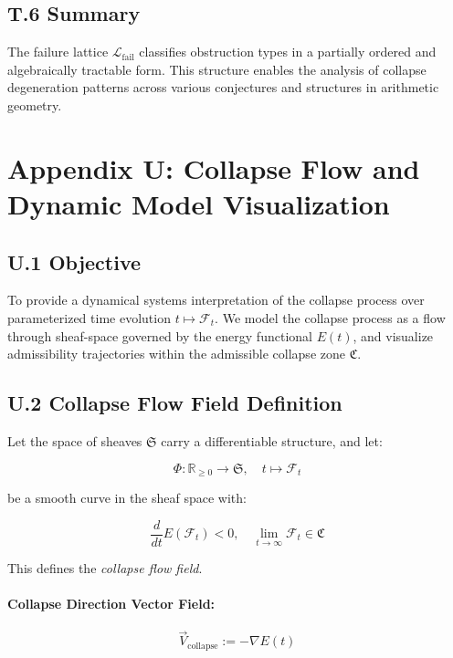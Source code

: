 \documentclass[11pt]{article}
\begin{document}
\subsection*{T.6 Summary}

The failure lattice \( \mathcal{L}_\mathrm{fail} \) classifies obstruction types in a partially ordered and algebraically tractable form. This structure enables the analysis of collapse degeneration patterns across various conjectures and structures in arithmetic geometry.



\appendix
\section*{Appendix U: Collapse Flow and Dynamic Model Visualization}

\subsection*{U.1 Objective}

To provide a dynamical systems interpretation of the collapse process over parameterized time evolution \( t \mapsto \mathcal{F}_t \). We model the collapse process as a flow through sheaf-space governed by the energy functional \( E(t) \), and visualize admissibility trajectories within the admissible collapse zone \( \mathfrak{C} \).

\subsection*{U.2 Collapse Flow Field Definition}

Let the space of sheaves \( \mathfrak{S} \) carry a differentiable structure, and let:

\[
\Phi : \mathbb{R}_{\geq 0} \to \mathfrak{S}, \quad t \mapsto \mathcal{F}_t
\]

be a smooth curve in the sheaf space with:

\[
\frac{d}{dt} E(\mathcal{F}_t) < 0, \quad \lim_{t \to \infty} \mathcal{F}_t \in \mathfrak{C}
\]

This defines the \emph{collapse flow field}.

\paragraph{Collapse Direction Vector Field:}
\[
\vec{V}_{\mathrm{collapse}} := -\nabla E(t)
\]
\end{document}
